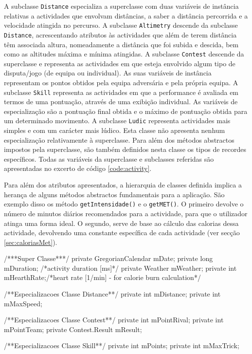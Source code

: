 \documentclass[a4paper,10pt]{report}
\begin{document}
A subclasse \verb!Distance! especializa a superclasse com duas variáveis de instância relativas a actividades que envolvam distâncias, a saber a 
distância percorrida e a velocidade atingida no percurso.
A subclasse \verb!Altimetry! descende da subclasse \verb!Distance!, acrescentando atributos às actividades que além de terem distância têm associada altura, 
nomeadamente a distância que foi subida e descida, bem como as altitudes máxima e mínima atingidas.
A subclasse \verb!Contest! descende da superclasse e representa as actividades em que esteja envolvido algum tipo de disputa/jogo (de equipa ou individual).
As suas variáveis de instância representam os pontos obtidos pela equipa adversária e pela própria equipa.
A subclasse \verb!Skill! representa as actividades em que a performance é avaliada em termos de uma pontuação, através de uma exibição individual.
As variáveis de especialização são a pontuação final obtida e o máximo de pontuação obtida para um determinado movimento.
A subclasse \verb!Ludic! representa actividades mais simples e com um carácter mais lúdico. Esta classe não apresenta nenhum especialização relativamente à 
superclasse. Para além dos métodos abstractos impostos pela superclasse, são também definidos nesta classe os tipos de recordes específicos.
Todas as variáveis da superclasse e subclasses referidas são apresentadas no excerto de código \ref{code:activity}.

Para além dos atributos apresentados, a hierarquia de classes definida implica a herança de alguns métodos abstractos fundamentais para a aplicação.
São exemplo disso os método \verb!getIntensidade()! e o \verb!getMET()!.
O primeiro devolve o número de minutos diários recomendados para a actividade, para que o utilizador atinga uma forma ideal. 
O segundo, serve de base ao cálculo das calorias dessa actividade, devolvendo uma constante específica de cada actividade (ver secção \ref{sec:caloriasMet}).

\begin{code}[caption=Variáveis de instância da superclasse Activity e subclasses respectivas (src/model/activity)., label=code:activity]
/***Super Classe***/
private GregorianCalendar mDate;
private long mDuration; /*activity duration [ms]*/
private Weather mWeather;
private int mHearthRate;/*heart rate [1/min] - for calorie burn calculation*/

/**Especializacoes Classe Distance**/
private int mDistance;
private int mMaxSpeed;

/**Especializacoes Classe Contest**/
private int mPointRival;
private int mPointTeam;
private Contest.Result mResult;

/**Especializacoes Classe Skill**/
private int mPoints;
private int mMaxTrick;
\end{code}
\end{document}
